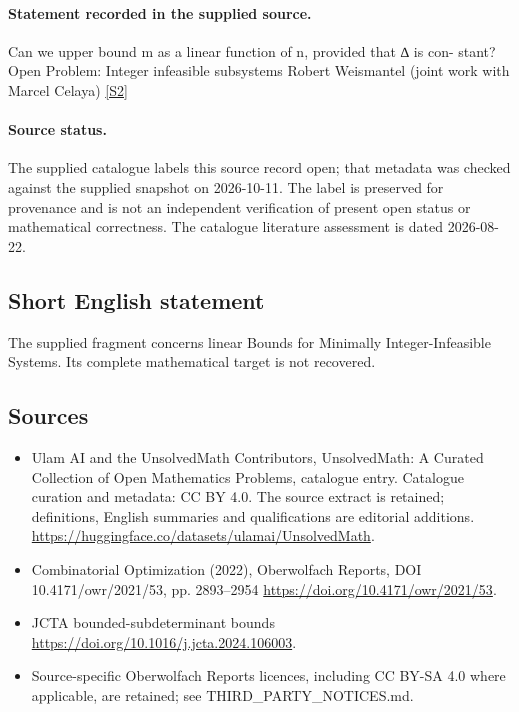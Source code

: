 \documentclass[11pt]{article}
\newcommand{\sref}[2]{\hyperlink{source:#1:#2}{[S#2]}}
\begin{document}
\paragraph{Statement recorded in the supplied source.}
Can we upper bound m as a linear function of n, provided that ∆ is con- stant? Open Problem: Integer infeasible subsystems Robert Weismantel (joint work with Marcel Celaya) \sref{statement}{2}
\paragraph{Source status.}
The supplied catalogue labels this source record open; that metadata was checked against the supplied snapshot on 2026-10-11. The label is preserved for provenance and is not an independent verification of present open status or mathematical correctness. The catalogue literature assessment is dated 2026-08-22.
\subsection{Short English statement}
The supplied fragment concerns linear Bounds for Minimally Integer-Infeasible Systems. Its complete mathematical target is not recovered.
\subsection{Sources}
\begin{itemize}
\item[\hypertarget{source:statement:1}{S1}] Ulam AI and the UnsolvedMath Contributors, UnsolvedMath: A Curated Collection of Open Mathematics Problems, catalogue entry. Catalogue curation and metadata: CC BY 4.0. The source extract is retained; definitions, English summaries and qualifications are editorial additions.
\url{https://huggingface.co/datasets/ulamai/UnsolvedMath}.
\item[\hypertarget{source:statement:2}{S2}] Combinatorial Optimization (2022), Oberwolfach Reports, DOI 10.4171/owr/2021/53, pp. 2893--2954
\url{https://doi.org/10.4171/owr/2021/53}.
\item[\hypertarget{source:statement:3}{S3}] JCTA bounded-subdeterminant bounds
\url{https://doi.org/10.1016/j.jcta.2024.106003}.
\item Source-specific Oberwolfach Reports licences, including CC BY-SA 4.0 where applicable, are retained; see THIRD\_PARTY\_NOTICES.md.
\end{itemize}
\end{document}

